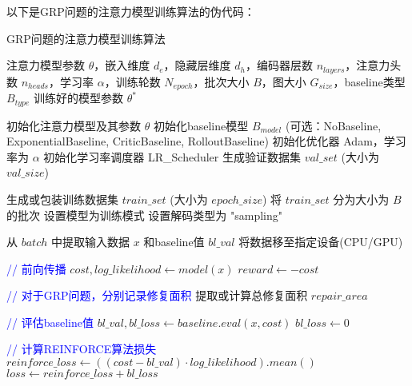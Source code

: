 \documentclass[10pt,a4paper]{article}
\begin{document}
以下是GRP问题的注意力模型训练算法的伪代码：

\begin{algorithm}[h]
    \begin{algorithmic}[1]
        \caption{GRP问题的注意力模型训练算法} \label{alg:grp_training}
        \Require 注意力模型参数 $\theta$，嵌入维度 $d_e$，隐藏层维度 $d_h$，编码器层数 $n_{layers}$，注意力头数 $n_{heads}$，学习率 $\alpha$，训练轮数 $N_{epoch}$，批次大小 $B$，图大小 $G_{size}$，baseline类型 $B_{type}$
        \Ensure 训练好的模型参数 $\theta^*$

        \State 初始化注意力模型及其参数 $\theta$
        \State 初始化baseline模型 $B_{model}$ (可选：NoBaseline, ExponentialBaseline, CriticBaseline, RolloutBaseline)
        \State 初始化优化器 Adam，学习率为 $\alpha$
        \State 初始化学习率调度器 LR\_Scheduler
        \State 生成验证数据集 $val\_set$ (大小为 $val\_size$)
        
            \State 生成或包装训练数据集 $train\_set$ (大小为 $epoch\_size$)
            \State 将 $train\_set$ 分为大小为 $B$ 的批次
            \State 设置模型为训练模式
            \State 设置解码类型为 "sampling"
            
                \State 从 $batch$ 中提取输入数据 $x$ 和baseline值 $bl\_val$
                \State 将数据移至指定设备(CPU/GPU)
                
                \State \textcolor{blue}{// 前向传播}
                \State $cost, log\_likelihood \leftarrow model(x)$
                \State $reward \leftarrow -cost$
                
                \State \textcolor{blue}{// 对于GRP问题，分别记录修复面积}
                    \State 提取或计算总修复面积 $repair\_area$
                \EndIf
                
                \State \textcolor{blue}{// 评估baseline值}
                    \State $bl\_val, bl\_loss \leftarrow baseline.eval(x, cost)$
                \Else
                    \State $bl\_loss \leftarrow 0$
                \EndIf
                
                \State \textcolor{blue}{// 计算REINFORCE算法损失}
                \State $reinforce\_loss \leftarrow ((cost - bl\_val) \cdot log\_likelihood).mean()$
                \State $loss \leftarrow reinforce\_loss + bl\_loss$
                

\end{algorithmic}
\end{algorithm}
\end{document}
